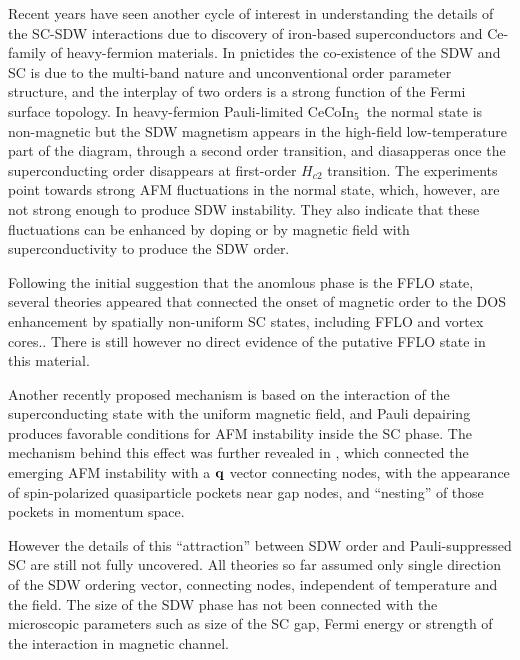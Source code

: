 \documentclass[aps,prl,twocolumn,showpacs,amsmath,amssymb]{revtex4-1}
\newcommand{\cecoin}{CeCoIn$_5$}
\begin{document}
Recent years have seen another cycle of interest in understanding the details of the SC-SDW interactions 
due to discovery of 
iron-based superconductors\cite{Johnston2010_review} 
and 
Ce-family of heavy-fermion materials\cite{Petrovic01_ce115,  Kenzelmann08_Qphase}.
In pnictides the co-existence of the SDW and SC is due to the multi-band nature 
and unconventional order parameter structure, and the interplay of two orders is a  
strong function of the 
Fermi surface topology.\cite{vor10_sc_sdw,*Fernandes2010_sdw_sc}
In heavy-fermion Pauli-limited \cecoin\ the normal state is non-magnetic but the SDW magnetism 
appears in the high-field low-temperature part of the diagram, through a second order transition, 
and diasapperas once the superconducting order disappears at first-order $H_{c2}$ transition. 
\cite{Bianchi2003_fflo, Kenzelmann08_Qphase, Kenzelmann10_Qphase}
The experiments point towards strong AFM fluctuations in the normal state,\cite{Paglione03_qcp115,*Bianchi03_qcp115} 
which, however, are not 
strong enough to produce SDW instability. They also indicate that these fluctuations can be 
enhanced by doping\cite{Pham2006_doping115} or by magnetic field with superconductivity\cite{Petrovic01_ce115,  Kenzelmann08_Qphase} to produce the SDW order. 

Following the initial suggestion that the anomlous phase is the FFLO state, several theories 
appeared that connected the onset of 
magnetic order to the DOS enhancement by spatially non-uniform SC states, including 
FFLO\cite{yanase11_mag_afm_fflo,Miyake08_sdw_fflo} and vortex cores.\cite{suzuki11_sdw_vortex}.
There is still however no direct evidence of the putative FFLO state in this material. 

Another recently proposed mechanism is based on the interaction of the superconducting state 
with the uniform magnetic field, and Pauli depairing produces favorable conditions for AFM 
instability inside the SC phase.\cite{ikeda10_sc_afm}
The mechanism behind this effect was further revealed in \cite{kato11_sc_afm}, 
which connected the emerging AFM instability with a ${\bf q}$ vector connecting nodes, 
with the appearance of spin-polarized 
quasiparticle pockets near gap nodes, 
and ``nesting'' of those pockets in momentum space.  

However the details of this ``attraction'' between SDW order and Pauli-suppressed SC 
are still not fully uncovered. 
All theories so far assumed only single direction of the SDW ordering vector, connecting nodes, 
independent of temperature and the field. 
The size of the SDW phase has not been connected with the microscopic parameters such as 
size of the SC gap, Fermi energy or strength of the interaction in magnetic channel. 
\end{document}
